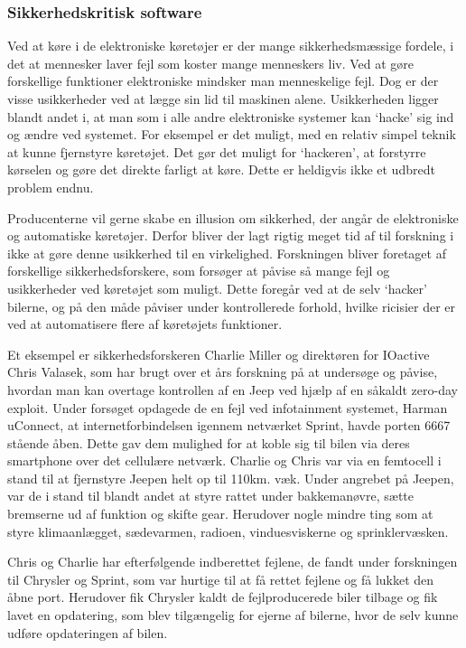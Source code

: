 \subsubsection{Sikkerhedskritisk software}
Ved at køre i de elektroniske køretøjer er der mange sikkerhedsmæssige fordele, i det at mennesker laver fejl som koster mange menneskers liv. Ved at gøre forskellige funktioner elektroniske mindsker man menneskelige fejl. Dog er der visse usikkerheder ved at lægge sin lid til maskinen alene. Usikkerheden ligger blandt andet i, at man som i alle andre elektroniske systemer kan `hacke' sig ind og ændre ved systemet. For eksempel er det muligt, med en relativ simpel teknik at kunne fjernstyre køretøjet. Det gør det muligt for `hackeren', at forstyrre kørselen og gøre det direkte farligt at køre. Dette er heldigvis ikke et udbredt problem endnu.  

Producenterne vil gerne skabe en illusion om sikkerhed, der angår de elektroniske og automatiske køretøjer. Derfor bliver der lagt rigtig meget tid af til forskning i ikke at gøre denne usikkerhed til en virkelighed. Forskningen bliver foretaget af forskellige sikkerhedsforskere, som forsøger at påvise så mange fejl og usikkerheder ved køretøjet som muligt. Dette foregår ved at de selv `hacker' bilerne, og på den måde påviser under kontrollerede forhold, hvilke ricisier der er ved at automatisere flere af køretøjets funktioner.\cite{Jeep1}

Et eksempel er sikkerhedsforskeren Charlie Miller og direktøren for IOactive Chris Valasek, som har brugt over et års forskning på at undersøge og påvise, hvordan man kan overtage kontrollen af en Jeep ved hjælp af en såkaldt zero-day exploit. Under forsøget opdagede de en fejl ved infotainment systemet, Harman uConnect, at internetforbindelsen igennem netværket Sprint, havde porten 6667 stående åben. Dette gav dem mulighed for at koble sig til bilen via deres smartphone over det cellulære netværk. Charlie og Chris var via en femtocell i stand til at fjernstyre Jeepen helt op til 110km. væk. Under angrebet på Jeepen, var de i stand til blandt andet at styre rattet under bakkemanøvre, sætte bremserne ud af funktion og skifte gear. Herudover nogle mindre ting som at styre klimaanlægget, sædevarmen, radioen, vinduesviskerne og sprinklervæsken. \cite{Jeep1}\cite{Jeep2}

Chris og Charlie har efterfølgende indberettet fejlene, de fandt under forskningen til Chrysler og Sprint, som var hurtige til at få rettet fejlene og få lukket den åbne port. Herudover fik Chrysler kaldt de fejlproducerede biler tilbage og fik lavet en opdatering, som blev tilgængelig for ejerne af bilerne, hvor de selv kunne udføre opdateringen af bilen. \cite{Jeep1}   


